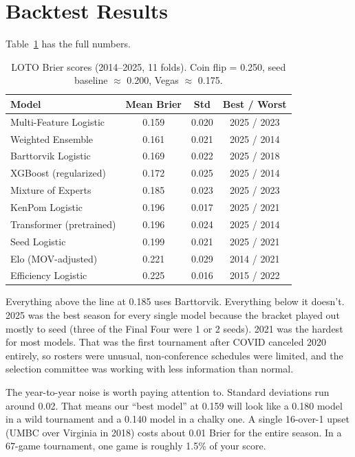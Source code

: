\documentclass[11pt,a4paper]{article}
\begin{document}
\section{Backtest Results}

Table~\ref{tab:loto} has the full numbers.

\begin{table}[h]
\centering
\caption{LOTO Brier scores (2014--2025, 11 folds). Coin flip = 0.250, seed baseline $\approx$ 0.200, Vegas $\approx$ 0.175.}
\label{tab:loto}
\small
\begin{tabular}{@{}lccc@{}}
\toprule
\textbf{Model} & \textbf{Mean Brier} & \textbf{Std} & \textbf{Best / Worst} \\
\midrule
Multi-Feature Logistic & 0.159 & 0.020 & 2025 / 2023 \\
Weighted Ensemble & 0.161 & 0.021 & 2025 / 2014 \\
Barttorvik Logistic & 0.169 & 0.022 & 2025 / 2018 \\
XGBoost (regularized) & 0.172 & 0.025 & 2025 / 2014 \\
Mixture of Experts & 0.185 & 0.023 & 2025 / 2023 \\
KenPom Logistic & 0.196 & 0.017 & 2025 / 2021 \\
Transformer (pretrained) & 0.196 & 0.024 & 2025 / 2014 \\
Seed Logistic & 0.199 & 0.021 & 2025 / 2021 \\
Elo (MOV-adjusted) & 0.221 & 0.029 & 2014 / 2021 \\
Efficiency Logistic & 0.225 & 0.016 & 2015 / 2022 \\
\bottomrule
\end{tabular}
\end{table}

Everything above the line at 0.185 uses Barttorvik. Everything below it doesn't. 2025 was the best season for every single model because the bracket played out mostly to seed (three of the Final Four were 1 or 2 seeds). 2021 was the hardest for most models. That was the first tournament after COVID canceled 2020 entirely, so rosters were unusual, non-conference schedules were limited, and the selection committee was working with less information than normal.

The year-to-year noise is worth paying attention to. Standard deviations run around 0.02. That means our ``best model'' at 0.159 will look like a 0.180 model in a wild tournament and a 0.140 model in a chalky one. A single 16-over-1 upset (UMBC over Virginia in 2018) costs about 0.01 Brier for the entire season. In a 67-game tournament, one game is roughly 1.5\% of your score.
\end{document}
